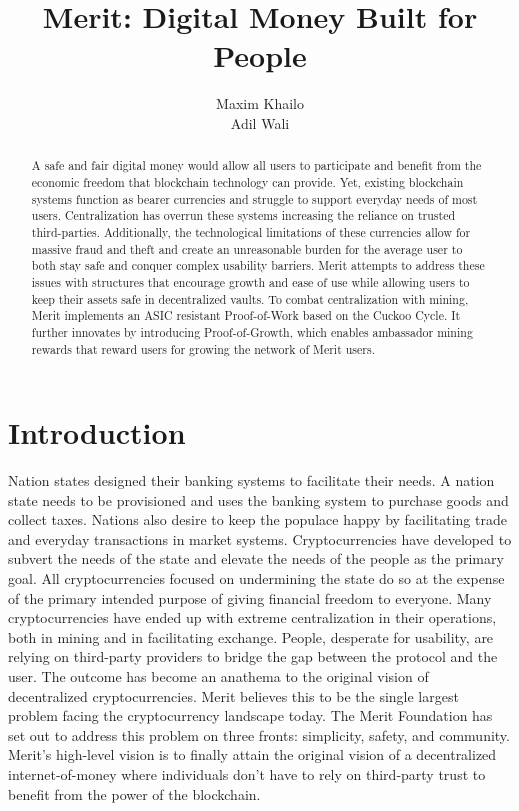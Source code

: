\documentclass{article}
\title{Merit: Digital Money Built for People}
\author{Maxim Khailo \\ Adil Wali}
\begin{document}
\maketitle

\begin{abstract}
    A safe and fair digital money would allow all users to participate and
    benefit from the economic freedom that \gls{blockchain} technology can provide.
    Yet, existing blockchain systems function as bearer currencies and struggle to support
     everyday needs of most users.  Centralization has overrun these systems increasing
     the reliance on trusted third-parties.  Additionally, the technological limitations of
     these currencies allow for massive fraud and theft and create an unreasonable burden
    for the average user to both stay safe and conquer complex usability barriers.
    Merit attempts to address these issues with structures that encourage growth 
    and ease of use while allowing users to keep their assets safe in \gls{decentralized vaults}.
    To combat centralization with mining, Merit implements an \gls{ASIC} resistant Proof-of-Work based on the
    Cuckoo Cycle.  It further innovates by introducing Proof-of-Growth, which enables ambassador mining 
    rewards that reward users for growing the network of Merit users.  
\end{abstract}

\section{Introduction}

Nation states designed their banking systems to facilitate their needs.
A nation state needs to be provisioned and uses the banking system to purchase goods
and collect taxes.  Nations also desire to keep the populace happy by facilitating
trade and everyday \glspl{transaction} in market systems.  Cryptocurrencies
have developed to subvert the needs of the state and elevate the needs of the
people as the primary goal.  All cryptocurrencies focused on undermining the state
do so at the expense of the primary intended purpose of giving financial freedom to everyone.
Many cryptocurrencies have ended up with extreme centralization in their operations,
both in mining and in facilitating exchange.  People, desperate for usability,
are relying on third-party providers to bridge the gap between the protocol and the user.
The outcome has become an anathema to the original vision of decentralized cryptocurrencies.
Merit believes this to be the single largest problem facing the cryptocurrency landscape today.
The Merit Foundation has set out to address this problem on three fronts: simplicity, safety, and community.
Merit's high-level vision is to finally attain the original vision of a decentralized internet-of-money
where individuals don't have to rely on third-party trust to benefit from the power of the blockchain.
\end{document}
